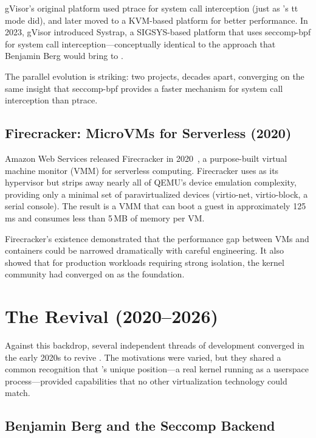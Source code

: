 gVisor's original platform used ptrace for system call interception (just
as \UML{}'s tt mode did), and later moved to a KVM-based platform for
better performance.  In 2023, gVisor introduced Systrap, a SIGSYS-based
platform that uses seccomp-bpf for system call interception---conceptually
identical to the approach that Benjamin Berg would bring to \UML{}.

The parallel evolution is striking: two projects, decades apart, converging
on the same insight that seccomp-bpf provides a faster mechanism for system
call interception than ptrace.

\subsection{Firecracker: MicroVMs for Serverless (2020)}
\label{sec:history-firecracker}

Amazon Web Services released Firecracker in 2020~\cite{agache2020}, a
purpose-built virtual machine monitor (VMM) for serverless computing.
Firecracker uses \KVM{} as its hypervisor but strips away nearly all of
QEMU's device emulation complexity, providing only a minimal set of
paravirtualized devices (virtio-net, virtio-block, a serial console).  The
result is a VMM that can boot a guest in approximately 125\,ms and
consumes less than 5\,MB of memory per VM.

Firecracker's existence demonstrated that the performance gap between VMs
and containers could be narrowed dramatically with careful engineering.  It
also showed that for production workloads requiring strong isolation, the
kernel community had converged on \KVM{} as the foundation.

\section{The Revival (2020--2026)}
\label{sec:history-revival}

Against this backdrop, several independent threads of development converged
in the early 2020s to revive \UML{}.  The motivations were varied, but they
shared a common recognition that \UML{}'s unique position---a real kernel
running as a userspace process---provided capabilities that no other
virtualization technology could match.

\subsection{Benjamin Berg and the Seccomp Backend}
\label{sec:history-seccomp}

